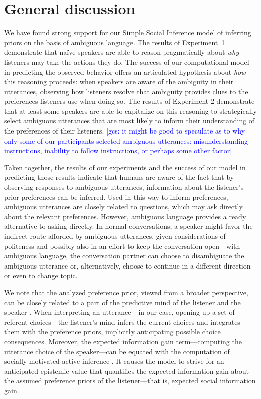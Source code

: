 \documentclass[10pt,a4paper]{article}
\newcommand{\gcs}[1]{\textcolor{blue}{[gcs: #1]}}
\begin{document}
\section{General discussion}

We have found strong support for our Simple Social Inference model of inferring priors on the basis of ambiguous language.
The results of Experiment~1 demonstrate that na\"ive speakers are able to reason pragmatically about \emph{why} listeners may take the actions they do. 
The success of our computational model in predicting the observed behavior offers an articulated hypothesis about \emph{how} this reasoning proceeds: when speakers are aware of the ambiguity in their utterances, observing how listeners resolve that ambiguity provides clues to the preferences listeners use when doing so.
The results of Experiment 2 demonstrate that at least some speakers are able to capitalize on this reasoning to strategically select ambiguous utterances that are most likely to inform their understanding of the preferences of their listeners. \gcs{it might be good to speculate as to why only some of our participants selected ambiguous utterances: misunderstanding instructions, inability to follow instructions, or perhaps some other factor}

Taken together, the results of our experiments and the success of our model in predicting those results indicate that humans are aware of the fact that by observing responses to ambiguous utterances, information about the listener's prior preferences can be inferred. 
Used in this way to inform preferences, ambiguous utterances are closely related to questions, which may ask directly about the relevant preferences. 
However, ambiguous language provides a ready alternative to asking directly. In normal conversations, a speaker might favor the indirect route afforded by ambiguous utterances, given considerations of politeness and possibly also in an effort to keep the conversation open---with ambiguous language, the conversation partner can choose to disambiguate the ambiguous utterance or, alternatively, choose to continue in a different direction or even to change topic.


We note that the analyzed preference prior, viewed from a broader perspective, can be closely related to a part of the predictive mind of the listener and the speaker \cite{Butz:2016,Butz:2017}. 
When interpreting an utterance---in our case, opening up a set of referent choices---the listener's mind infers the current choices and integrates them with the preference priors, implicitly anticipating possible choice consequences.
Moreover, the expected information gain term---computing the utterance choice of the speaker---can be equated with the computation of socially-motivated active inference \cite{Butz:2017a,Friston:2015}.
It causes the model to strive for an anticipated epistemic value that quantifies the expected information gain about the assumed preference priors of the listener---that is, expected social information gain. 
\end{document}
